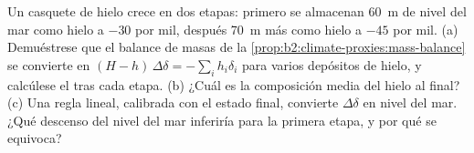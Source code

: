 \begin{exercise}[$\star\star\star$]\label{exo:b2:climate-proxies:12}
Un casquete de hielo crece en dos etapas: primero se almacenan \qty{60}{m} de nivel del mar como hielo a $-30$ por mil,
después \qty{70}{m} más como hielo a $-45$ por mil. (a) Demuéstrese que el balance de masas de la
\cref{prop:b2:climate-proxies:mass-balance} se convierte en $(H - h)\,\Delta\delta = -\sum_i h_i\delta_i$
para varios depósitos de hielo, y calcúlese el  tras cada etapa. (b) ¿Cuál es la composición
media del hielo al final? (c) Una regla lineal, calibrada con el estado final, convierte
$\Delta\delta$ en nivel del mar. ¿Qué descenso del nivel del mar inferiría para la primera etapa, y por qué
se equivoca?
\end{exercise}


